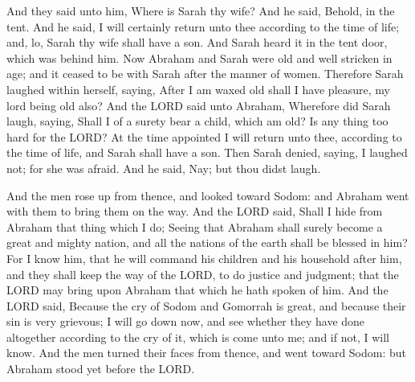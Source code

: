  And they said unto him, Where is Sarah thy wife? And he
said, Behold, in the tent.  And he said, I will certainly
return unto thee according to the time of life; and, lo, Sarah thy wife
shall have a son. And Sarah heard it in the tent door, which was behind
him.  Now Abraham and Sarah were old and well stricken in
age; and it ceased to be with Sarah after the manner of women.
 Therefore Sarah laughed within herself, saying, After I
am waxed old shall I have pleasure, my lord being old also?
 And the LORD said unto Abraham, Wherefore did Sarah
laugh, saying, Shall I of a surety bear a child, which am old?
 Is any thing too hard for the LORD? At the time
appointed I will return unto thee, according to the time of life, and
Sarah shall have a son.  Then Sarah denied, saying, I
laughed not; for she was afraid. And he said, Nay; but thou didst laugh.

 And the men rose up from thence, and looked toward
Sodom: and Abraham went with them to bring them on the way.
 And the LORD said, Shall I hide from Abraham that thing
which I do;  Seeing that Abraham shall surely become a
great and mighty nation, and all the nations of the earth shall be
blessed in him?  For I know him, that he will command his
children and his household after him, and they shall keep the way of the
LORD, to do justice and judgment; that the LORD may bring upon Abraham
that which he hath spoken of him.  And the LORD said,
Because the cry of Sodom and Gomorrah is great, and because their sin is
very grievous;  I will go down now, and see whether they
have done altogether according to the cry of it, which is come unto me;
and if not, I will know.  And the men turned their faces
from thence, and went toward Sodom: but Abraham stood yet before the
LORD.

